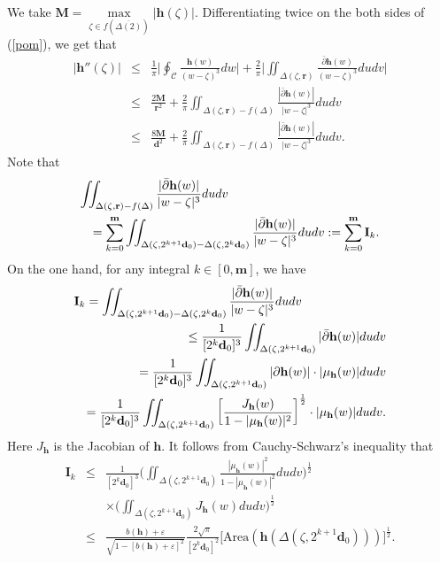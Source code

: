 \documentclass[11pt]{amsart}
\theoremstyle{remark}
\theoremstyle{claim}
\theoremstyle{definition}
\theoremstyle{problem}
\theoremstyle{conjecture}
\theoremstyle{question}
\numberwithin{equation}{section}
\begin{document}
We take $\mathbf{M}=\max\limits_{\zeta\in f(\overline{\Delta(2)})}|\mathbf{h}(\zeta)|.$ Differentiating twice on the both sides of  (\ref{pom}), we get that
\begin{eqnarray}\label{key-1}|{\mathbf{h}}''(\zeta)| &\leq &  \frac{1}{\pi}\Big |\oint_{\mathcal{C}} \frac{\mathbf{h}(w)}{(w-\zeta)^3}dw\Big |+\frac{2}{\pi}\Big|\iint_{\Delta(\zeta, \mathbf{r})}\frac{\bar{\partial} \mathbf{h}(w)}{(w-\zeta)^3}dudv\Big| \\
&\leq & \frac{2\mathbf{M}}{{\mathbf{r}}^2} + \frac{2}{\pi}\iint_{\Delta(\zeta, \mathbf{r})-f(\Delta)}\frac{|\bar{\partial} \mathbf{h}(w)|}{|w-\zeta|^3}dudv \nonumber \\
&\leq & \frac{8\mathbf{M}}{{\mathbf{d}}^2}+\frac{2}{\pi}\iint_{\Delta(\zeta, \mathbf{r})-f(\Delta)}\frac{|\bar{\partial} \mathbf{h}(w)|}{|w-\zeta|^3}dudv. \nonumber
\end{eqnarray}
Note that
\begin{eqnarray}
\lefteqn{\iint_{\Delta(\zeta, \mathbf{r})-f(\Delta)}\frac{|\bar{\partial} \mathbf{h}(w)|}{|w-\zeta|^3}dudv} \nonumber \\&& = \sum_{k=0}^{{\mathbf{m}}}\iint_{\Delta(\zeta, 2^{k+1}\mathbf{d}_0)-\Delta(\zeta, 2^k \mathbf{d}_0)}\frac{|\bar{\partial}\mathbf{h}(w)|}{|w-\zeta|^3}dudv:=\sum_{k=0}^{{\mathbf{m}}} \mathbf{I}_k.  \nonumber
\end{eqnarray}
On the one hand, for any integral $k\in [0, {\mathbf{m}}]$, we have
\begin{eqnarray}
\lefteqn{\mathbf{I}_k=\iint_{\Delta(\zeta, 2^{k+1}\mathbf{d}_0)-\Delta(\zeta, 2^k \mathbf{d}_0)}\frac{|\bar{\partial} \mathbf{h}(w)|}{|w-\zeta|^3}dudv} \nonumber\\&& \leq \frac{1}{[2^k\mathbf{d}_0]^3}
\iint_{\Delta(\zeta, 2^{k+1}\mathbf{d}_0)}|\bar{\partial}  \mathbf{h}(w)|dudv \nonumber \\
&&  =\frac{1}{[2^k\mathbf{d}_0]^3}
\iint_{\Delta(\zeta, 2^{k+1}\mathbf{d}_0)} |{\partial} \mathbf{h}(w)|\cdot |\mu_{ \mathbf{h}}(w)|dudv \nonumber \\
&& =  \frac{1}{[2^k\mathbf{d}_0]^3}
\iint_{\Delta(\zeta, 2^{k+1}\mathbf{d}_0)} \left[\frac{J_{\mathbf{h}}(w)}{1-|\mu_{\mathbf{h}}(w)|^2}\right]^{\frac{1}{2}}\cdot |\mu_{ \mathbf{h}}(w)|dudv. \nonumber
\end{eqnarray}
Here $J_{\mathbf{h}}$ is the Jacobian of $\mathbf{h}$. It follows from Cauchy-Schwarz's inequality that
 \begin{eqnarray}\label{Ik}
\mathbf{I}_k &\leq&  \frac{1}{[2^k\mathbf{d}_0]^3}
 \Big(\iint_{\Delta(\zeta, 2^{k+1}\mathbf{d}_0)}\frac{|\mu_{ \mathbf{h}}(w)|^2}{1-|\mu_{\mathbf{h}}(w)|^2}dudv\Big)^{\frac{1}{2}}
 \\
&& \times \Big(\iint_{\Delta(\zeta, 2^{k+1}\mathbf{d}_0)} J_{\mathbf{h}}(w) dudv\Big)^{\frac{1}{2}} \nonumber  \\
 & \leq & \frac{b(\mathbf{h})+\varepsilon}{\sqrt{1-[b(\mathbf{h})+\varepsilon]^2}}\frac{2\sqrt{\pi}}{[2^k\mathbf{d}_0]^2}
  \Big[{\text {Area}}(\mathbf{h}(\Delta(\zeta, 2^{k+1}\mathbf{d}_0)))\Big]^{\frac{1}{2}}.\nonumber
\end{eqnarray}
\end{document}
